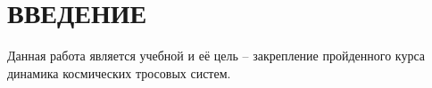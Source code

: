 \section*{ВВЕДЕНИЕ}

Данная работа является учебной и её цель – закрепление пройденного курса динамика космических тросовых систем.